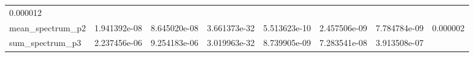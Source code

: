 \documentclass[11pt]{article}
\begin{document}
\begin{longtable}[]{@{}llllllll@{}}
\begin{minipage}[t]{0.08\columnwidth}
0.000012\strut
\end{minipage}\tabularnewline
\begin{minipage}[t]{0.16\columnwidth}\raggedright
mean\_spectrum\_p2\strut
\end{minipage} & \begin{minipage}[t]{0.09\columnwidth}\raggedright
1.941392e-08\strut
\end{minipage} & \begin{minipage}[t]{0.09\columnwidth}\raggedright
8.645020e-08\strut
\end{minipage} & \begin{minipage}[t]{0.09\columnwidth}\raggedright
3.661373e-32\strut
\end{minipage} & \begin{minipage}[t]{0.09\columnwidth}\raggedright
5.513623e-10\strut
\end{minipage} & \begin{minipage}[t]{0.09\columnwidth}\raggedright
2.457506e-09\strut
\end{minipage} & \begin{minipage}[t]{0.09\columnwidth}\raggedright
7.784784e-09\strut
\end{minipage} & \begin{minipage}[t]{0.08\columnwidth}\raggedright
0.000002\strut
\end{minipage}\tabularnewline
\begin{minipage}[t]{0.16\columnwidth}\raggedright
sum\_spectrum\_p3\strut
\end{minipage} & \begin{minipage}[t]{0.09\columnwidth}\raggedright
2.237456e-06\strut
\end{minipage} & \begin{minipage}[t]{0.09\columnwidth}\raggedright
9.254183e-06\strut
\end{minipage} & \begin{minipage}[t]{0.09\columnwidth}\raggedright
3.019963e-32\strut
\end{minipage} & \begin{minipage}[t]{0.09\columnwidth}\raggedright
8.739905e-09\strut
\end{minipage} & \begin{minipage}[t]{0.09\columnwidth}\raggedright
7.283541e-08\strut
\end{minipage} & \begin{minipage}[t]{0.09\columnwidth}\raggedright
3.913508e-07\strut
\end{minipage} & \begin{minipage}[t]{0.08\columnwidth}\raggedright

\end{minipage}
\end{longtable}
\end{document}
